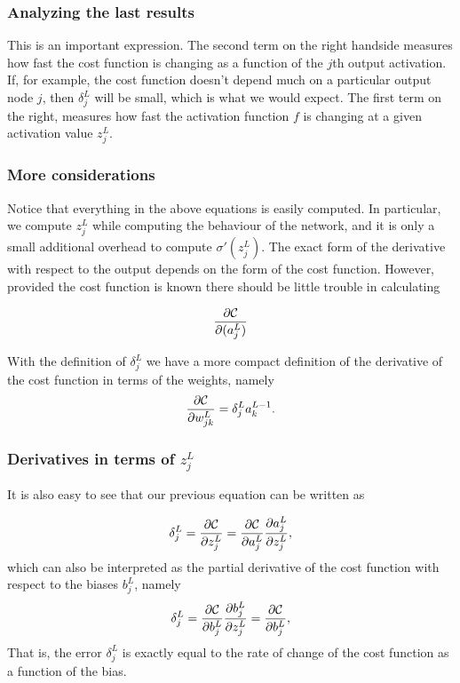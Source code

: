 \documentclass{beamer}
\begin{document}
\begin{frame}
\frametitle{Analyzing the last results}

This is an important expression. The second term on the right handside
measures how fast the cost function is changing as a function of the $j$th
output activation.  If, for example, the cost function doesn't depend
much on a particular output node $j$, then $\delta_j^L$ will be small,
which is what we would expect. The first term on the right, measures
how fast the activation function $f$ is changing at a given activation
value $z_j^L$.
\end{frame}

\begin{frame}
\frametitle{More considerations}

Notice that everything in the above equations is easily computed.  In
particular, we compute $z_j^L$ while computing the behaviour of the
network, and it is only a small additional overhead to compute
$\sigma'(z^L_j)$.  The exact form of the derivative with respect to the
output depends on the form of the cost function.
However, provided the cost function is known there should be little
trouble in calculating

\[
\frac{\partial {\cal C}}{\partial (a_j^L)}
\]

With the definition of $\delta_j^L$ we have a more compact definition of the derivative of the cost function in terms of the weights, namely
\[
\frac{\partial{\cal C}}{\partial w_{jk}^L}  =  \delta_j^La_k^{L-1}.
\]
\end{frame}

\begin{frame}
\frametitle{Derivatives in terms of $z_j^L$}

It is also easy to see that our previous equation can be written as

\[
\delta_j^L =\frac{\partial {\cal C}}{\partial z_j^L}= \frac{\partial {\cal C}}{\partial a_j^L}\frac{\partial a_j^L}{\partial z_j^L},
\]
which can also be interpreted as the partial derivative of the cost function with respect to the biases $b_j^L$, namely
\[
\delta_j^L = \frac{\partial {\cal C}}{\partial b_j^L}\frac{\partial b_j^L}{\partial z_j^L}=\frac{\partial {\cal C}}{\partial b_j^L},
\]
That is, the error $\delta_j^L$ is exactly equal to the rate of change of the cost function as a function of the bias.
\end{frame}
\end{document}
